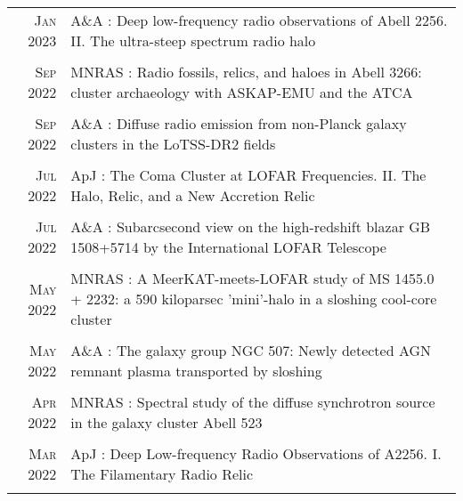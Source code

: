 \documentclass[11pt,a4paper,notitlepage]{article}
\begin{document}
\begin{tabular}{r|p{12.5cm}}
	
%	
	\textsc{Jan 2023} & A\&A : Deep low-frequency radio observations of Abell 2256. II. The ultra-steep spectrum radio halo \citep{2023AA...669A...1R} \\
	\multicolumn{2}{c}{} \\

	\textsc{Sep 2022} & MNRAS : Radio fossils, relics, and haloes in Abell 3266: cluster archaeology with ASKAP-EMU and the ATCA \citep{2022MNRAS.515.1871R} \\
	\multicolumn{2}{c}{} \\

	\textsc{Sep 2022} & A\&A : Diffuse radio emission from non-Planck galaxy clusters in the LoTSS-DR2 fields \citep{2022AA...665A..60H} \\
	\multicolumn{2}{c}{} \\

	\textsc{Jul 2022} & ApJ : The Coma Cluster at LOFAR Frequencies. II. The Halo, Relic, and a New Accretion Relic \citep{2022ApJ...933..218B} \\
	\multicolumn{2}{c}{} \\

	\textsc{Jul 2022} & A\&A : Subarcsecond view on the high-redshift blazar GB 1508+5714 by the International LOFAR Telescope \citep{2022AA...663A..44K} \\
	\multicolumn{2}{c}{} \\

	\textsc{May 2022} & MNRAS : A MeerKAT-meets-LOFAR study of MS 1455.0 + 2232: a 590 kiloparsec 'mini'-halo in a sloshing cool-core cluster \citep{2022MNRAS.512.4210R} \\
	\multicolumn{2}{c}{} \\

	\textsc{May 2022} & A\&A : The galaxy group NGC 507: Newly detected AGN remnant plasma transported by sloshing \citep{2022AA...661A..92B} \\
	\multicolumn{2}{c}{} \\

	\textsc{Apr 2022} & MNRAS : Spectral study of the diffuse synchrotron source in the galaxy cluster Abell 523 \citep{2022MNRAS.511.3389V} \\
	\multicolumn{2}{c}{} \\

	\textsc{Mar 2022} & ApJ : Deep Low-frequency Radio Observations of A2256. I. The Filamentary Radio Relic \citep{2022ApJ...927...80R} \\
	\multicolumn{2}{c}{} \\


\end{tabular}
\end{document}

